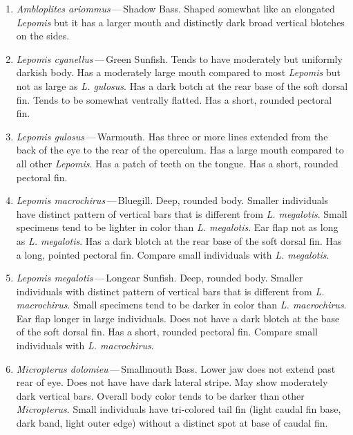 \documentclass[11pt]{article}
\begin{document}
\begin{enumerate}
	\item\textit{Ambloplites ariommus}\,—\,Shadow Bass. Shaped somewhat like an elongated \textit{Lepomis} but it has a larger mouth and distinctly dark broad vertical blotches on the sides.

	\item\textit{Lepomis cyanellus}\,—\,Green Sunfish. Tends to have moderately but uniformly darkish body. Has a moderately large mouth compared to most \textit{Lepomis} but not as large as \textit{L. gulosus}. Has a dark botch at the rear base of the soft dorsal fin. Tends to be somewhat ventrally flatted. Has a short, rounded pectoral fin.

	\item\textit{Lepomis gulosus}\,—\,Warmouth. Has three or more lines extended from the back of the eye to the rear of the operculum. Has a large mouth compared to all other \textit{Lepomis}. Has a patch of teeth on the tongue. Has a short, rounded pectoral fin.

	\item\textit{Lepomis macrochirus}\,—\,Bluegill. Deep, rounded body. Smaller individuals have distinct pattern of vertical bars that is different from \textit{L. megalotis}. Small specimens tend to be lighter in color than \textit{L. megalotis}. Ear flap not as long as \textit{L. megalotis}. Has a dark blotch at the rear base of the soft dorsal fin. Has a long, pointed pectoral fin. Compare small individuals with \textit{L. megalotis}.

	\item\textit{Lepomis megalotis}\,—\,Longear Sunfish. Deep, rounded body. Smaller individuals with distinct pattern of vertical bars that is different from \textit{L. macrochirus}. Small specimens tend to be darker in color than \textit{L. macrochirus}. Ear flap longer in large individuals. Does not have a dark blotch at the base of the soft dorsal fin. Has a short, rounded pectoral fin. Compare small individuals with \textit{L. macrochirus}.

	\item\textit{Micropterus dolomieu}\,—\,Smallmouth Bass. Lower jaw does not extend past rear of eye. Does not have have dark lateral stripe. May show moderately dark vertical bars. Overall body color tends to be darker than other \textit{Micropterus}. Small individuals have tri-colored tail fin (light caudal fin base, dark band, light outer edge) without a distinct spot at base of caudal fin.


\end{enumerate}
\end{document}
